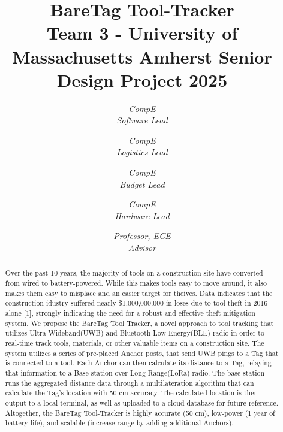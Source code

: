 \documentclass[conference]{IEEEtran}
\begin{document}
\title{BareTag Tool-Tracker\\
{\footnotesize {Team 3 - University of Massachusetts Amherst Senior Design Project 2025 }}
}

\author{
\textit{CompE}\\
\textit{Software Lead}

\and
{}
\textit{CompE}\\
\textit{Logistics Lead}

\and
{}
\textit{CompE}\\
\textit{Budget Lead} 

\and
{}
\textit{CompE}\\
\textit{Hardware Lead}

\and 
{}
\textit{Professor, ECE}\\
\textit{Advisor}

}

\maketitle

\begin{abstract}
    Over the past 10 years, the majority of tools on a construction 
    site have converted from wired to battery-powered. While this 
    makes tools easy to move around, it also makes them easy to misplace
    and an easier target for theives. Data indicates that the construction
    idustry suffered nearly \$1,000,000,000 in loses due to tool theft in
    2016 alone [1], strongly indicating the need for a robust and effective 
    theft mitigation system. We propose the BareTag Tool Tracker, a novel
    approach to tool tracking that utilizes Ultra-Wideband(UWB) and Bluetooth 
    Low-Energy(BLE) radio in order to real-time track tools, materials, or other 
    valuable items on a construction site. The system utilizes a series
    of pre-placed Anchor posts, that send UWB pings to a Tag that is connected
    to a tool. Each Anchor can then calculate its distance to a Tag, relaying
    that information to a Base station over Long Range(LoRa) radio. The 
    base station runs the aggregated distance data through a multilateration
    algorithm that can calculate the Tag's location with 50 cm accuracy.
    The calculated location is then output to a local terminal, as well as 
    uploaded to a cloud database for future reference. Altogether, the BareTag Tool-Tracker
    is highly accurate (50 cm), low-power (1 year of battery life), and
    scalable (increase range by adding additional Anchors).
\end{abstract}
\end{document}
